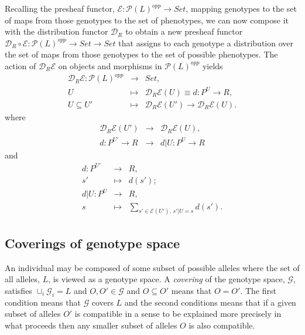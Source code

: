 \documentclass[10pt]{article}
\begin{document}
Recalling the presheaf functor, $\mathcal{E} \colon \mathcal{P}(L)^{opp} \rightarrow Set$, mapping genotypes to the set of maps from those genotypes to the set of phenotypes, we can now compose it with the distribution functor $\mathcal{D}_R$ to obtain a new presheaf functor $\mathcal{D}_R \circ \mathcal{E} \colon \mathcal{P}(L)^{opp} \rightarrow Set \rightarrow Set$ that assigns to each genotype a distribution over the set of maps from those genotypes to the set of possible phenotypes. The action of $\mathcal{D}_R \mathcal{E}$ on objects and morphisms in $\mathcal{P}(L)^{opp}$ yields
\begin{eqnarray*}
\mathcal{D}_R \mathcal{E} \colon \mathcal{P}(L)^{opp} &\rightarrow& Set,\\
U &\mapsto& \mathcal{D}_R \mathcal{E}(U) \equiv d \colon P^U \rightarrow R,\\ 
U \subseteq U' &\mapsto& \mathcal{D}_R \mathcal{E}(U') \rightarrow \mathcal{D}_R \mathcal{E}(U).
\end{eqnarray*}
where
\begin{eqnarray*}
\mathcal{D}_R \mathcal{E}(U') &\rightarrow& \mathcal{D}_R \mathcal{E}(U),\\
d \colon P^{U'} \rightarrow R &\rightarrow& d|U \colon P^{U} \rightarrow R
\end{eqnarray*}
and
\begin{eqnarray*}
d \colon P^{U'} &\rightarrow& R,\\
s' &\mapsto& d(s');\\
d|U \colon P^{U} &\rightarrow& R,\\
s &\mapsto& \sum_{s' \in \mathcal{E}(U'),\, s'|U=s} d(s').
\end{eqnarray*}

\subsection*{Coverings of genotype space}
An individual may be composed of some subset of possible alleles where the set of all alleles, $L$, is viewed as a genotype space. A \emph{covering} of the genotype space, $\mathcal{G}$, satisfies $\cup_i \mathcal{G}_i = L$ and $O,O' \in \mathcal{G}$ and $O \subseteq O'$ means that $O = O'$. The first condition means that $\mathcal{G}$ covers $L$ and the second conditions means that if a given subset of alleles $O'$ is compatible in a sense to be explained more precisely in what proceeds then any smaller subset of alleles $O$ is also compatible.
\end{document}
